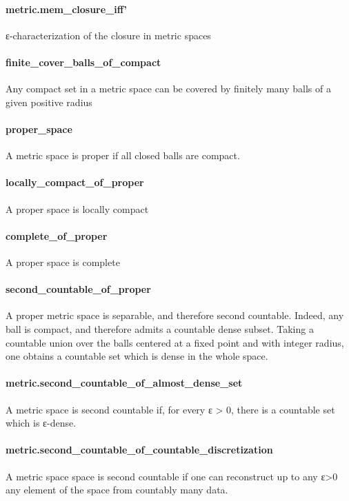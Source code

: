 \documentclass{article}
\begin{document}
\paragraph{metric.mem\_closure\_iff'}
\par
ε-characterization of the closure in metric spaces
\paragraph{finite\_cover\_balls\_of\_compact}
\par
Any compact set in a metric space can be covered by finitely many balls of a given positive
radius
\paragraph{proper\_space}
\par
A metric space is proper if all closed balls are compact.
\paragraph{locally\_compact\_of\_proper}
\par
A proper space is locally compact
\paragraph{complete\_of\_proper}
\par
A proper space is complete
\paragraph{second\_countable\_of\_proper}
\par
A proper metric space is separable, and therefore second countable. Indeed, any ball is
compact, and therefore admits a countable dense subset. Taking a countable union over the balls
centered at a fixed point and with integer radius, one obtains a countable set which is
dense in the whole space.
\paragraph{metric.second\_countable\_of\_almost\_dense\_set}
\par
A metric space is second countable if, for every ε > 0, there is a countable set which is ε-dense.
\paragraph{metric.second\_countable\_of\_countable\_discretization}
\par
A metric space space is second countable if one can reconstruct up to any ε>0 any element of the
space from countably many data.
\end{document}
